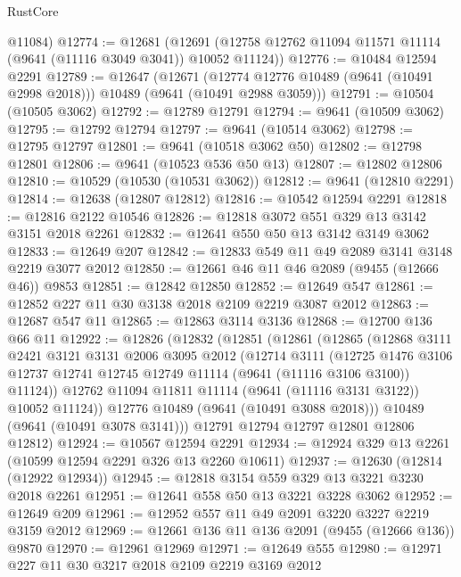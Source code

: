 \begin{lexlean}{RustCore}
\begin{coremodule}
      @11084)
@12774 := @12681
    (@12691 (@12758 @12762 @11094 @11571 @11114 (@9641 (@11116 @3049 @3041)) @10052 @11124))
@12776 := @10484 @12594 @2291
@12789 := @12647
    (@12671 (@12774 @12776 @10489 (@9641 (@10491 @2998 @2018))) @10489 (@9641 (@10491 @2988 @3059)))
@12791 := @10504 (@10505 @3062)
@12792 := @12789 @12791
@12794 := @9641 (@10509 @3062)
@12795 := @12792 @12794
@12797 := @9641 (@10514 @3062)
@12798 := @12795 @12797
@12801 := @9641 (@10518 @3062 @50)
@12802 := @12798 @12801
@12806 := @9641 (@10523 @536 @50 @13)
@12807 := @12802 @12806
@12810 := @10529 (@10530 (@10531 @3062))
@12812 := @9641 (@12810 @2291)
@12814 := @12638 (@12807 @12812)
@12816 := @10542 @12594 @2291
@12818 := @12816 @2122 @10546
@12826 := @12818 @3072 @551 @329 @13 @3142 @3151 @2018 @2261
@12832 := @12641 @550 @50 @13 @3142 @3149 @3062
@12833 := @12649 @207
@12842 := @12833 @549 @11 @49 @2089 @3141 @3148 @2219 @3077 @2012
@12850 := @12661 @46 @11 @46 @2089 (@9455 (@12666 @46)) @9853
@12851 := @12842 @12850
@12852 := @12649 @547
@12861 := @12852 @227 @11 @30 @3138 @2018 @2109 @2219 @3087 @2012
@12863 := @12687 @547 @11
@12865 := @12863 @3114 @3136
@12868 := @12700 @136 @66 @11
@12922 := @12826
    (@12832
      (@12851
        (@12861
          (@12865
            (@12868
              @3111
              @2421
              @3121
              @3131
              @2006
              @3095
              @2012
              (@12714
                @3111
                (@12725
                  @1476
                  @3106
                  @12737
                  @12741
                  @12745
                  @12749
                  @11114
                  (@9641 (@11116 @3106 @3100))
                  @11124))
              @12762
              @11094
              @11811
              @11114
              (@9641 (@11116 @3131 @3122))
              @10052
              @11124))
          @12776
          @10489
          (@9641 (@10491 @3088 @2018)))
        @10489
        (@9641 (@10491 @3078 @3141)))
      @12791
      @12794
      @12797
      @12801
      @12806
      @12812)
@12924 := @10567 @12594 @2291
@12934 := @12924 @329 @13 @2261 (@10599 @12594 @2291 @326 @13 @2260 @10611)
@12937 := @12630 (@12814 (@12922 @12934))
@12945 := @12818 @3154 @559 @329 @13 @3221 @3230 @2018 @2261
@12951 := @12641 @558 @50 @13 @3221 @3228 @3062
@12952 := @12649 @209
@12961 := @12952 @557 @11 @49 @2091 @3220 @3227 @2219 @3159 @2012
@12969 := @12661 @136 @11 @136 @2091 (@9455 (@12666 @136)) @9870
@12970 := @12961 @12969
@12971 := @12649 @555
@12980 := @12971 @227 @11 @30 @3217 @2018 @2109 @2219 @3169 @2012

\end{coremodule}
\end{lexlean}
